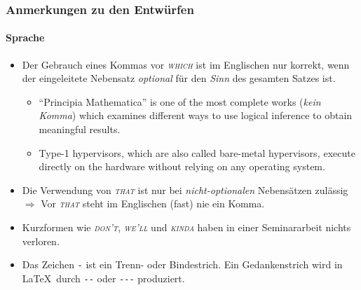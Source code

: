 \documentclass{i20lecture}
\subtitle{Session 2}
\begin{document}
\frame{\titlepage}

\begin{frame}
  \frametitle{Anmerkungen zu den Entwürfen}
  \framesubtitle{Sprache}

  \begin{itemize}
    \item Der Gebrauch eines Kommas vor \emph{\textsc{which}} ist im Englischen nur
    korrekt, wenn der eingeleitete Nebensatz \emph{optional} für den \emph{Sinn} des gesamten
    Satzes ist.
    \begin{itemize}
      \item ``Principia Mathematica'' is one of the most complete works
      (\emph{kein Komma}) which examines different ways to use logical inference
      to obtain meaningful results.
      \item Type-1 hypervisors\emph{,} which are also called bare-metal hypervisors\emph{,}
      execute directly on the hardware without relying on any operating system.
    \end{itemize}
    
    \item Die Verwendung von \emph{\textsc{that}} ist nur bei \emph{nicht-optionalen}
    Nebensätzen zulässig $\Rightarrow$ Vor \emph{\textsc{that}} steht im Englischen
    (fast) nie ein Komma.
    \item Kurzformen wie \emph{\textsc{don't}}, \emph{\textsc{we'll}} und \emph{\textsc{kinda}} haben in einer Seminararbeit
    nichts verloren.
    \item Das Zeichen \texttt{-} ist ein Trenn- oder Bindestrich. Ein
    Gedankenstrich wird in \LaTeX\ durch \texttt{-}\texttt{-} oder
    \texttt{-}\texttt{-}\texttt{-}
    produziert.
  \end{itemize}
\end{frame}
\end{document}
